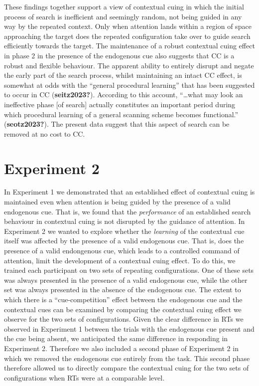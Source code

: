 \documentclass[
  man,
  floatsintext,
  longtable,
  nolmodern,
  notxfonts,
  notimes,
  colorlinks=true,linkcolor=blue,citecolor=blue,urlcolor=blue]{apa7}
\begin{document}
These findings together support a view of contextual cuing in which the
initial process of search is inefficient and seemingly random, not being
guided in any way by the repeated context. Only when attention lands
within a region of space approaching the target does the repeated
configuration take over to guide search efficiently towards the target.
The maintenance of a robust contextual cuing effect in phase 2 in the
presence of the endogenous cue also suggests that CC is a robust and
flexible behaviour. The apparent ability to entirely disrupt and negate
the early part of the search process, whilst maintaining an intact CC
effect, is somewhat at odds with the ``general procedural learning''
that has been suggested to occur in CC (\textbf{seitz2023?}). According
to this account, ``\ldots what may look an ineffective phase {[}of
search{]} actually constitutes an important period during which
procedural learning of a general scanning scheme becomes functional.''
(\textbf{seotz2023?}). The present data suggest that this aspect of
search can be removed at no cost to CC.

\section{Experiment 2}\label{experiment-2}

In Experiment 1 we demonstrated that an established effect of contextual
cuing is maintained even when attention is being guided by the presence
of a valid endogenous cue. That is, we found that the \emph{performance}
of an established search behaviour in contextual cuing is not disrupted
by the guidance of attention. In Experiment 2 we wanted to explore
whether the \emph{learning} of the contextual cue itself was affected by
the presence of a valid endogenous cue. That is, does the presence of a
valid endongenous cue, which leads to a controlled command of attention,
limit the development of a contextual cuing effect. To do this, we
trained each participant on two sets of repeating configurations. One of
these sets was always presented in the presence of a valid endogenous
cue, while the other set was always presented in the absence of the
endogenous cue. The extent to which there is a ``cue-competition''
effect between the endogenous cue and the contextual cues can be
examined by comparing the contextual cuing effect we observe for the two
sets of configurations. Given the clear difference in RTs we observed in
Experiment 1 between the trials with the endogenous cue present and the
cue being absent, we anticipated the same difference in responding in
Experiment 2. Therefore we also included a second phase of Experiment 2
in which we removed the endogenous cue entirely from the task. This
second phase therefore allowed us to directly compare the contextual
cuing for the two sets of configurations when RTs were at a comparable
level.
\end{document}
